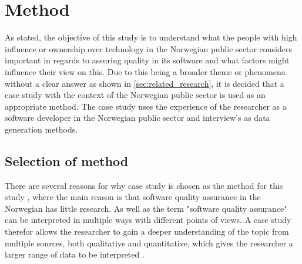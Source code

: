 \chapter{Method}


As stated, the objective of this study is to understand what the people with high influence or ownership over technology in the Norwegian public sector considers important in regards to assuring quality in its software and what factors might influence their view on this. Due to this being a broader theme or phenomena \cite{bjo_2022} without a clear answer as shown in \autoref{sec:related_research}, it is decided that a case study with the context of the Norwegian public sector is used as an appropriate method. The case study uses the experience of the researcher as a software developer in the Norwegian public sector and interview's as data generation methods.

\section{Selection of method}
There are several reasons for why case study is chosen as the method for this study \cite{bjo_2022}, where the main reason is that software quality assurance in the Norwegian has little research. As well as the term "software quality assurance" can be interpreted in multiple ways with different points of views. A case study therefor allows the researcher to gain a deeper understanding of the topic from multiple sources, both qualitative and quantitative, which gives the researcher a larger range of data to be interpreted \cite{bjo_2022}.

